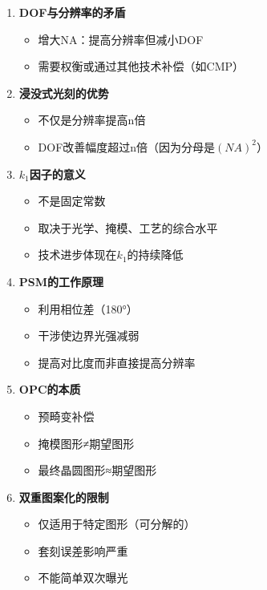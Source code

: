 \documentclass[UTF8,12pt,a4paper]{ctexart}
\begin{document}
\begin{enumerate}
    \item \textbf{DOF与分辨率的矛盾}
    \begin{itemize}
        \item 增大NA：提高分辨率但减小DOF
        \item 需要权衡或通过其他技术补偿（如CMP）
    \end{itemize}
    
    \item \textbf{浸没式光刻的优势}
    \begin{itemize}
        \item 不仅是分辨率提高n倍
        \item DOF改善幅度超过n倍（因为分母是$(NA)^2$）
    \end{itemize}
    
    \item \textbf{$k_1$因子的意义}
    \begin{itemize}
        \item 不是固定常数
        \item 取决于光学、掩模、工艺的综合水平
        \item 技术进步体现在$k_1$的持续降低
    \end{itemize}
    
    \item \textbf{PSM的工作原理}
    \begin{itemize}
        \item 利用相位差（180°）
        \item 干涉使边界光强减弱
        \item 提高对比度而非直接提高分辨率
    \end{itemize}
    
    \item \textbf{OPC的本质}
    \begin{itemize}
        \item 预畸变补偿
        \item 掩模图形≠期望图形
        \item 最终晶圆图形≈期望图形
    \end{itemize}
    
    \item \textbf{双重图案化的限制}
    \begin{itemize}
        \item 仅适用于特定图形（可分解的）
        \item 套刻误差影响严重
        \item 不能简单双次曝光
    \end{itemize}
    

\end{enumerate}
\end{document}
